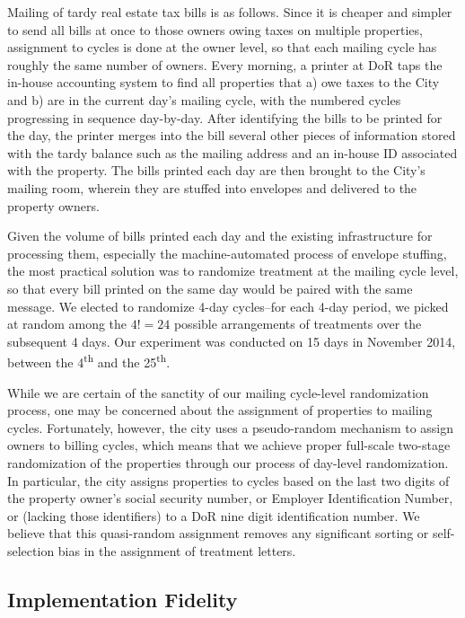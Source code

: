 \documentclass[12pt,titlepage]{article}
\begin{document}
Mailing of tardy real estate tax bills is as follows.
Since it is cheaper and simpler to send all bills at once to those
owners owing taxes on multiple properties, assignment to cycles is
done at the owner level, so that each mailing cycle has roughly the
same number of owners.  Every morning, a printer at DoR taps the
in-house accounting system to find all properties that a) owe taxes to
the City and b) are in the current day's mailing cycle, with the
numbered cycles progressing in sequence day-by-day.  After identifying
the bills to be printed for the day, the printer merges into the bill
several other pieces of information stored with the tardy balance such
as the mailing address and an in-house ID associated with the
property. The bills printed each day are then
brought to the City's mailing room, wherein they are stuffed into
envelopes and delivered to the property owners.

Given the volume of bills printed each day and the existing
infrastructure for processing them, especially the machine-automated
process of envelope stuffing, the most practical solution was to
randomize treatment at the mailing cycle level, so that every bill
printed on the same day would be paired with the same message.  We
elected to randomize 4-day cycles--for each 4-day period, we picked at
random among the $4!=24$ possible arrangements of treatments over the
subsequent 4 days. Our experiment was conducted on 15 days in November
2014, between the 4\textsuperscript{th} and the
25\textsuperscript{th}.

While we are certain of the sanctity of our mailing cycle-level
randomization process, one may be concerned about the assignment of
properties to mailing cycles. Fortunately, however, the city uses a
pseudo-random mechanism to assign owners to billing cycles, which
means that we achieve proper full-scale two-stage randomization of the
properties through our process of day-level randomization. In
particular, the city assigns properties to cycles based on the last
two digits of the property owner's social security number, or Employer
Identification Number, or (lacking those identifiers) to a DoR nine
digit identification number.  We believe that this quasi-random
assignment removes any significant sorting or self-selection bias in
the assignment of treatment letters.


\subsection{Implementation Fidelity}
\end{document}
